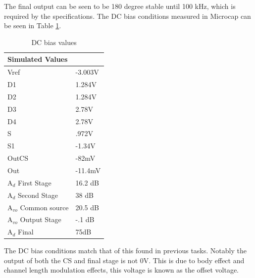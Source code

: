 The final output can be seen to be 180 degree stable until 100 kHz, which is required by the specifications.
The DC bias conditions measured in Microcap can be seen in Table \ref{tab:simdcbias}.


\begin{table}[H]
	\centering
	\caption{DC bias values}
	\label{tab:simdcbias}
	\begin{tabular}{|l|l|}
		\hline
		\textbf{Simulated Values} &         \\ \hline
		Vref                        & -3.003V \\ \hline
		D1                          & 1.284V  \\ \hline
		D2                          & 1.284V  \\ \hline
		D3                          & 2.78V   \\ \hline
		D4                          & 2.78V   \\ \hline
		S                           & .972V   \\ \hline
		S1                          & -1.34V  \\ \hline
		OutCS                       & -82mV   \\ \hline
		Out                         & -11.4mV \\ \hline
		A$_d$ First Stage   &  16.2 dB \\ \hline
		A$_d$ Second Stage & 38 dB \\ \hline
		A$_{vo}$ Common source & 20.5 dB \\ \hline
		A$_{vo}$ Output Stage & -.1 dB \\ \hline
		A$_d$     Final &  75dB \\ \hline
	\end{tabular}
\end{table}

The DC bias conditions match that of this found in previous tasks. Notably the output of both the CS  and final stage is not 0V. This is due to body effect and channel length modulation effects, this voltage is known as the offset voltage.



